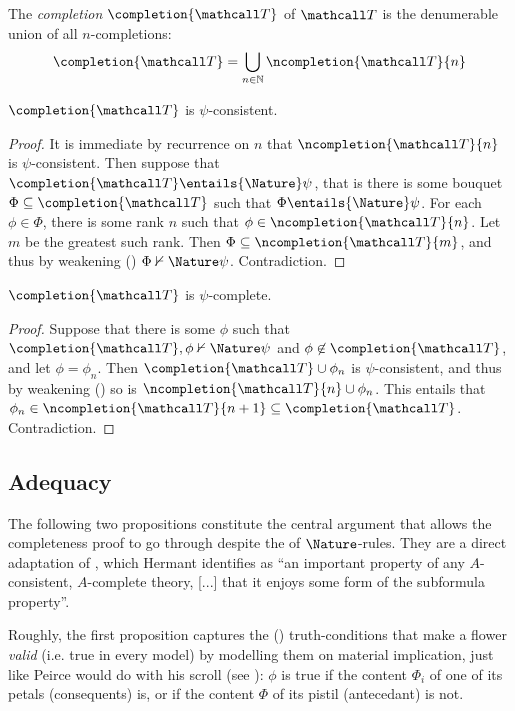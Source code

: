\begin{definition}[Completion]
  The \emph{completion} $\completion{\tT}$ of $\tT$ is the denumerable union of all
  $n$-completions:
  $$\completion{\tT} = \bigcup_{n \in \nats}{\ncompletion{\tT}{n}}$$
\end{definition}

\begin{lemma}
  $\completion{\tT}$ is $\psi$-consistent.
\end{lemma}
\begin{proof}
  It is immediate by recurrence on $n$ that $\ncompletion{\tT}{n}$ is
  $\psi$-consistent. Then suppose that $\completion{\tT} \entails{\Nature} \psi$,
  that is there is some bouquet $\Phi \subseteq \completion{\tT}$ such that $\Phi
  \entails{\Nature} \psi$. For each $\phi \in \Phi$, there is some rank $n$ such
  that $\phi \in \ncompletion{\tT}{n}$. Let $m$ be the greatest such rank. Then
  $\Phi \subseteq \ncompletion{\tT}{m}$, and thus by weakening
  () $\Phi \nvdash{\Nature} \psi$. Contradiction.
\end{proof}


\begin{lemma}
  $\completion{\tT}$ is $\psi$-complete.
\end{lemma}
\begin{proof}
  Suppose that there is some $\phi$ such that $\completion{\tT}, \phi
  \nvdash{\Nature} \psi$ and $\phi \not\in \completion{\tT}$, and let $\phi =
  \phi_n$. Then $\completion{\tT} \cup \phi_n$ is $\psi$-consistent, and thus by
  weakening () so is $\ncompletion{\tT}{n} \cup \phi_n$. This
  entails that $\phi_n \in \ncompletion{\tT}{n+1} \subseteq \completion{\tT}$.
  Contradiction.
\end{proof}

\subsection{Adequacy}

The following two propositions constitute the central argument that allows the
completeness proof to go through despite the  of $\Nature$-rules.
They are a direct adaptation of \cite[Proposition 7]{hutchison_semantic_2005},
which Hermant identifies as ``an important property of any $A$-consistent,
$A$-complete theory, [...] that it enjoys some form of the subformula
property''.

Roughly, the first proposition captures the () truth-conditions
that make a flower \emph{valid} (i.e. true in every model) by modelling them on
material implication, just like Peirce would do with his scroll (see
): $\phi$ is true if the content $\Phi_i$ of one of its petals
(consequents) is, or if the content $\Phi$ of its pistil (antecedant) is not.

